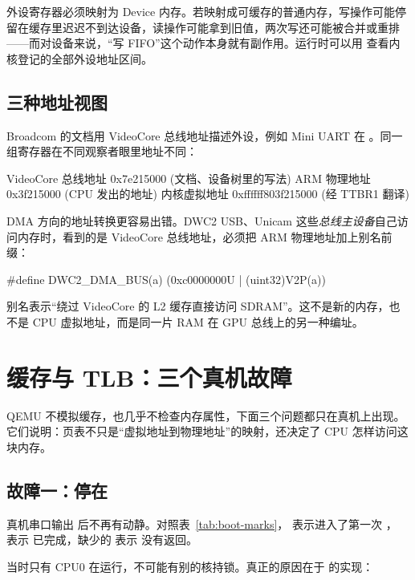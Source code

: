 外设寄存器必须映射为 Device 内存。若映射成可缓存的普通内存，写操作可能停留在缓存里迟迟不到达设备，读操作可能拿到旧值，两次写还可能被合并或重排——而对设备来说，“写 FIFO”这个动作本身就有副作用。运行时可以用  查看内核登记的全部外设地址区间。

\subsection{三种地址视图}

Broadcom 的文档用 VideoCore 总线地址描述外设，例如 Mini UART 在 。同一组寄存器在不同观察者眼里地址不同：

\begin{txtcode}
VideoCore 总线地址   0x7e215000     (文档、设备树里的写法)
ARM 物理地址         0x3f215000     (CPU 发出的地址)
内核虚拟地址         0xffffff803f215000  (经 TTBR1 翻译)
\end{txtcode}

DMA 方向的地址转换更容易出错。DWC2 USB、Unicam 这些\emph{总线主设备}自己访问内存时，看到的是 VideoCore 总线地址，必须把 ARM 物理地址加上别名前缀：

\begin{ccode}
#define DWC2_DMA_BUS(a) (0xc0000000U | (uint32)V2P(a))
\end{ccode}

 别名表示“绕过 VideoCore 的 L2 缓存直接访问 SDRAM”。这不是新的内存，也不是 CPU 虚拟地址，而是同一片 RAM 在 GPU 总线上的另一种编址。

\section{缓存与 TLB：三个真机故障}
\label{sec:caches}

QEMU 不模拟缓存，也几乎不检查内存属性，下面三个问题都只在真机上出现。它们说明：页表不只是“虚拟地址到物理地址”的映射，还决定了 CPU 怎样访问这块内存。

\subsection{故障一：停在 }
\label{sec:fault1}

真机串口输出  后不再有动静。对照表~\ref{tab:boot-marks}， 表示进入了第一次 ， 表示  已完成，缺少的  表示  没有返回。

当时只有 CPU0 在运行，不可能有别的核持锁。真正的原因在于  的实现：


